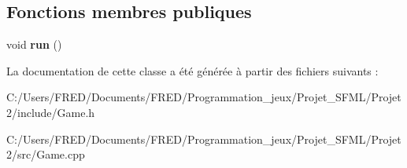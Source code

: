 \subsection*{Fonctions membres publiques}
\begin{DoxyCompactItemize}
\item 
void {\bfseries run} ()\hypertarget{class_game_a1ab78f5ed0d5ea879157357cf2fb2afa}{}\label{class_game_a1ab78f5ed0d5ea879157357cf2fb2afa}

\end{DoxyCompactItemize}


La documentation de cette classe a été générée à partir des fichiers suivants \+:\begin{DoxyCompactItemize}
\item 
C\+:/\+Users/\+F\+R\+E\+D/\+Documents/\+F\+R\+E\+D/\+Programmation\+\_\+jeux/\+Projet\+\_\+\+S\+F\+M\+L/\+Projet2/include/Game.\+h\item 
C\+:/\+Users/\+F\+R\+E\+D/\+Documents/\+F\+R\+E\+D/\+Programmation\+\_\+jeux/\+Projet\+\_\+\+S\+F\+M\+L/\+Projet2/src/Game.\+cpp\end{DoxyCompactItemize}
